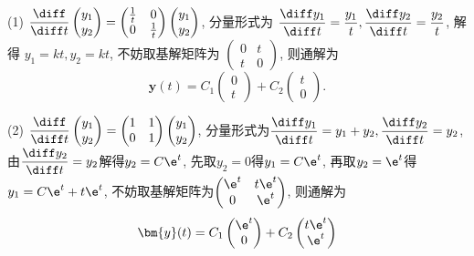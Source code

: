 \begin{solve}
  (1) $\displaystyle\frac{\diff}{\diff t}\begin{pmatrix}y_1\\y_2\end{pmatrix}=\begin{pmatrix}\frac{1}{t}&0\\0&\frac{1}{t}\end{pmatrix}\begin{pmatrix}y_1\\y_2\end{pmatrix}$, 
  分量形式为 $\displaystyle\frac{\diff y_1}{\diff t}=\frac{y_1}{t},\frac{\diff y_2}{\diff t}=\frac{y_2}{t}$, 
  解得 $y_1=kt,y_2=kt$, 不妨取基解矩阵为 $\begin{pmatrix}0&t\\t&0\end{pmatrix}$, 则通解为
  \[\bm{y}(t)=C_1\begin{pmatrix}0\\t\end{pmatrix}+C_2\begin{pmatrix}t\\0\end{pmatrix}.\]

  (2) $\displaystyle\frac{\diff}{\diff t}\begin{pmatrix}y_1\\y_2\end{pmatrix}=\begin{pmatrix}1&1\\0&1\end{pmatrix}\begin{pmatrix}y_1\\y_2\end{pmatrix}$, 
  分量形式为$\displaystyle\frac{\diff y_1}{\diff t}=y_1+y_2,\frac{\diff y_2}{\diff t}=y_2$, 
  由$\displaystyle\frac{\diff y_2}{\diff t}=y_2$解得$y_2=C\e^t$, 先取$y_2=0$得$y_1=C\e^t$, 
  再取$y_2=\e^t$得$y_1=C\e^t+t\e^t$, 不妨取基解矩阵为$\begin{pmatrix}\e^t&t\e^t\\0&\e^t\end{pmatrix}$, 则通解为
  \[\bm{y}(t)=C_1\begin{pmatrix}\e^t\\0\end{pmatrix}+C_2\begin{pmatrix}t\e^t\\\e^t\end{pmatrix}\]


\end{solve}
